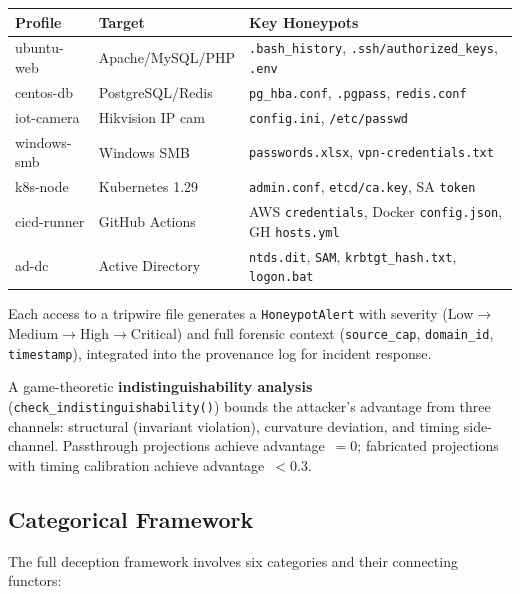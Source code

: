 \documentclass[11pt,a4paper]{article}
\theoremstyle{definition}
\theoremstyle{remark}
\begin{document}
\begin{center}\small
\begin{tabular}{llp{5.5cm}}
\toprule
\textbf{Profile} & \textbf{Target} & \textbf{Key Honeypots} \\
\midrule
ubuntu-web  & Apache/MySQL/PHP & \texttt{.bash\_history}, \texttt{.ssh/authorized\_keys}, \texttt{.env} \\
centos-db   & PostgreSQL/Redis & \texttt{pg\_hba.conf}, \texttt{.pgpass}, \texttt{redis.conf} \\
iot-camera  & Hikvision IP cam & \texttt{config.ini}, \texttt{/etc/passwd} \\
windows-smb & Windows SMB      & \texttt{passwords.xlsx}, \texttt{vpn-credentials.txt} \\
k8s-node    & Kubernetes 1.29  & \texttt{admin.conf}, \texttt{etcd/ca.key}, SA \texttt{token} \\
cicd-runner & GitHub Actions   & AWS \texttt{credentials}, Docker \texttt{config.json}, GH \texttt{hosts.yml} \\
ad-dc       & Active Directory & \texttt{ntds.dit}, \texttt{SAM}, \texttt{krbtgt\_hash.txt}, \texttt{logon.bat} \\
\bottomrule
\end{tabular}
\end{center}

Each access to a tripwire file generates a \texttt{HoneypotAlert} with
severity (Low$\to$Medium$\to$High$\to$Critical) and full forensic context
(\texttt{source\_cap}, \texttt{domain\_id}, \texttt{timestamp}), integrated
into the provenance log for incident response.

A game-theoretic \textbf{indistinguishability analysis}
(\texttt{check\_indistinguishability()}) bounds the attacker's advantage
from three channels: structural (invariant violation), curvature deviation,
and timing side-channel.  Passthrough projections achieve advantage~$= 0$;
fabricated projections with timing calibration achieve advantage~$< 0.3$.

\subsection{Categorical Framework}
\label{sec:deception-categories}

The full deception framework involves six categories and their
connecting functors:
\end{document}
